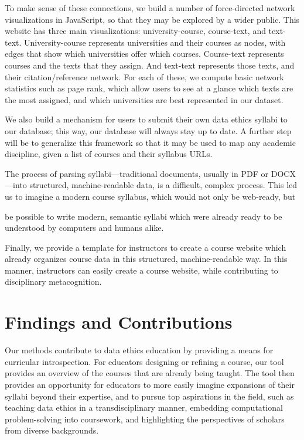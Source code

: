 \documentclass[
]{article}
\begin{document}
To make sense of these connections, we build a number of force-directed
network visualizations in JavaScript, so that they may be explored by a
wider public. This website has three main visualizations:
university-course, course-text, and text-text. University-course
represents universities and their courses as nodes, with edges that show
which universities offer which courses. Course-text represents courses
and the texts that they assign. And text-text represents those texts,
and their citation/reference network. For each of these, we compute
basic network statistics such as page rank, which allow users to see at
a glance which texts are the most assigned, and which universities are
best represented in our dataset.

We also build a mechanism for users to submit their own data ethics
syllabi to our database; this way, our database will always stay up to
date. A further step will be to generalize this framework so that it may
be used to map any academic discipline, given a list of courses and
their syllabus URLs.

The process of parsing syllabi---traditional documents, usually in PDF
or DOCX---into structured, machine-readable data, is a difficult,
complex process. This led us to imagine a modern course syllabus, which
would not only be web-ready, but

be possible to write modern, semantic syllabi which were already ready
to be understood by computers and humans alike.

Finally, we provide a template for instructors to create a course
website which already organizes course data in this structured,
machine-readable way. In this manner, instructors can easily create a
course website, while contributing to disciplinary metacognition.

\hypertarget{findings-and-contributions}{%
\section{Findings and Contributions}\label{findings-and-contributions}}

Our methods contribute to data ethics education by providing a means for
curricular introspection. For educators designing or refining a course,
our tool provides an overview of the courses that are already being
taught. The tool then provides an opportunity for educators to more
easily imagine expansions of their syllabi beyond their expertise, and
to pursue top aspirations in the field, such as teaching data ethics in
a transdisciplinary manner, embedding computational problem-solving into
coursework, and highlighting the perspectives of scholars from diverse
backgrounds.
\end{document}
